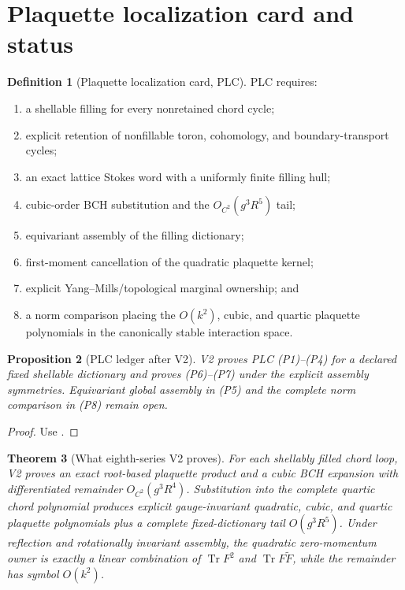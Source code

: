 \documentclass[11pt,oneside]{book}
\newtheorem{theorem}{Theorem}[chapter]
\newtheorem{proposition}[theorem]{Proposition}
\theoremstyle{definition}
\newtheorem{definition}[theorem]{Definition}
\theoremstyle{remark}
\newcommand{\Tr}{\operatorname{Tr}}
\begin{document}
\section{Plaquette localization card and status}
\label{sec:e8v2-card}

\begin{definition}[Plaquette localization card, PLC]
\label{def:e8v2-PLC}
PLC requires:
\begin{enumerate}[label=\textup{(P\arabic*)},leftmargin=4em]
\item a shellable filling for every nonretained chord cycle;
\item explicit retention of nonfillable toron, cohomology, and
      boundary-transport cycles;
\item an exact lattice Stokes word with a uniformly finite filling
      hull;
\item cubic-order BCH substitution and the
      \(O_{C^2}(g^3R^5)\) tail;
\item equivariant assembly of the filling dictionary;
\item first-moment cancellation of the quadratic plaquette kernel;
\item explicit Yang--Mills/topological marginal ownership; and
\item a norm comparison placing the \(O(k^2)\), cubic, and quartic
      plaquette polynomials in the canonically stable interaction
      space.
\end{enumerate}
\end{definition}

\begin{proposition}[PLC ledger after V2]
\label{prop:e8v2-PLC}
V2 proves PLC \textup{(P1)--(P4)} for a declared fixed shellable
dictionary and proves \textup{(P6)--(P7)} under the explicit assembly
symmetries.  Equivariant global assembly in \textup{(P5)} and the
complete norm comparison in \textup{(P8)} remain open.
\end{proposition}

\begin{proof}
Use
.
\end{proof}

\begin{theorem}[What eighth-series V2 proves]
\label{thm:e8v2-result}
For each shellably filled chord loop, V2 proves an exact root-based
plaquette product and a cubic BCH expansion with differentiated
remainder \(O_{C^2}(g^3R^4)\).  Substitution into the complete quartic
chord polynomial produces explicit gauge-invariant quadratic, cubic,
and quartic plaquette polynomials plus a complete fixed-dictionary
tail \(O(g^3R^5)\).  Under reflection and rotationally invariant
assembly, the
quadratic zero-momentum owner is exactly a linear combination of
\(\Tr F^2\) and \(\Tr F\widetilde F\), while the remainder has
symbol \(O(k^2)\).
\end{theorem}
\end{document}
